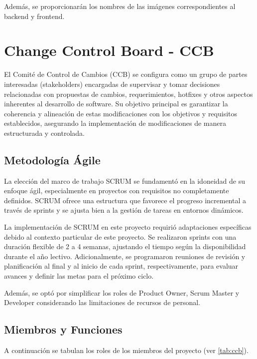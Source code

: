 Además, se proporcionarán los nombres de las imágenes correspondientes al backend y frontend.




\section{Change Control Board - CCB}

El Comité de Control de Cambios (CCB) se configura como un grupo de partes interesadas (stakeholders) encargadas de supervisar y tomar decisiones relacionadas con propuestas de cambios, requerimientos, hotfixes y otros aspectos inherentes al desarrollo de software. Su objetivo principal es garantizar la coherencia y alineación de estas modificaciones con los objetivos y requisitos establecidos, asegurando la implementación de modificaciones de manera estructurada y controlada.


\subsection{Metodología Ágile}
La elección del marco de trabajo SCRUM se fundamentó en la idoneidad de su enfoque ágil, especialmente en proyectos con requisitos no completamente definidos. SCRUM ofrece una estructura que favorece el progreso incremental a través de sprints y se ajusta bien a la gestión de tareas en entornos dinámicos.

La implementación de SCRUM en este proyecto requirió adaptaciones específicas debido al contexto particular de este proyecto. Se realizaron sprints con una duración flexible de 2 a 4 semanas, ajustando el tiempo según la disponibilidad durante el año lectivo. Adicionalmente, se programaron reuniones de revisión y planificación al final y al inicio de cada sprint, respectivamente, para evaluar avances y definir las metas para el próximo ciclo.

Además, se optó por simplificar los roles de Product Owner, Scrum Master y Developer considerando las limitaciones de recursos de personal.



\subsection{Miembros y Funciones}
A continuación se tabulan los roles de los miembros del proyecto (ver \ref{tab:ccb}).

